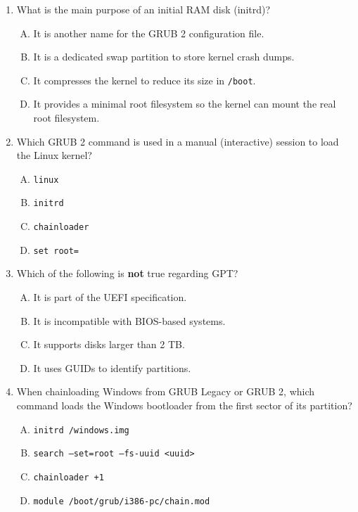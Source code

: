 \documentclass[a4paper]{report}
\begin{document}
\begin{enumerate}[1.]
    \item What is the main purpose of an initial RAM disk (initrd)?  
    \begin{enumerate}[A)]
        \item It is another name for the GRUB 2 configuration file.  
        \item It is a dedicated swap partition to store kernel crash dumps.  
        \item It compresses the kernel to reduce its size in \texttt{/boot}.  
        \item It provides a minimal root filesystem so the kernel can mount the real root filesystem.  
    \end{enumerate}

    \item Which GRUB 2 command is used in a manual (interactive) session to load the Linux kernel?  
    \begin{enumerate}[A)]
        \item \texttt{linux}  
        \item \texttt{initrd}  
        \item \texttt{chainloader}  
        \item \texttt{set root=}  
    \end{enumerate}

    \item Which of the following is \textbf{not} true regarding GPT?  
    \begin{enumerate}[A)]
        \item It is part of the UEFI specification.  
        \item It is incompatible with BIOS-based systems.  
        \item It supports disks larger than 2 TB.  
        \item It uses GUIDs to identify partitions.  
    \end{enumerate}

    \item When chainloading Windows from GRUB Legacy or GRUB 2, which command loads the Windows bootloader from the first sector of its partition?  
    \begin{enumerate}[A)]
        \item \texttt{initrd /windows.img}  
        \item \texttt{search --set=root --fs-uuid <uuid>}  
        \item \texttt{chainloader +1}  
        \item \texttt{module /boot/grub/i386-pc/chain.mod}  
    \end{enumerate}


\end{enumerate}
\end{document}
